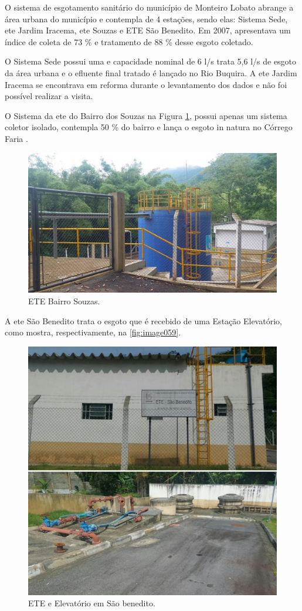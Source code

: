 O sistema de esgotamento sanitário do município de Monteiro Lobato abrange a área urbana do município e contempla de 4 estações, sendo elas: Sistema Sede, \gls{ete} Jardim Iracema, \gls{ete} Souzas e ETE São Benedito. Em 2007, apresentava um índice de coleta de 73 \% e tratamento de 88 \% desse esgoto coletado. 

O Sistema Sede possui uma e capacidade nominal de 6 l/s trata 5,6 l/s de esgoto da área urbana e o efluente final tratado é lançado no Rio Buquira. A \gls{ete} Jardim Iracema se encontrava em reforma durante o levantamento dos dados e não foi possível realizar a visita. 

O Sistema da \gls{ete} do Bairro dos Souzas na Figura \ref{fig:image058}, possui apenas um sistema coletor isolado, contempla 50 \% do bairro e lança o esgoto in natura no Córrego Faria \cite{MonteiroLobato}. 

\begin{figure}
	\centering
	\includegraphics[width=0.75\linewidth]{produtos/prodtres/image058}
	\caption{ETE Bairro Souzas.}
	\label{fig:image058}
\end{figure}


A \gls{ete} São Benedito trata o esgoto que é recebido de uma Estação Elevatório, como mostra, respectivamente, na \autoref{fig:image059}. 

\begin{figure}
	\centering
	\includegraphics[width=0.75\linewidth]{produtos/prodtres/image059}
	\caption{ETE e Elevatório em São benedito.}
	\label{fig:image059}
\end{figure}


